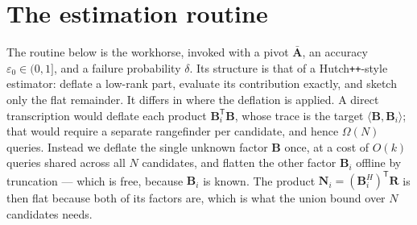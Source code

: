 \documentclass{article}
\renewcommand{\vec}[1]{\mathbf{#1}}          %
\newcommand{\T}{\mathsf{T}}                  %
\newcommand{\eps}{\varepsilon}
\newcommand{\inner}[2]{\langle #1, #2 \rangle}
\theoremstyle{remark}
\begin{document}
\section{The estimation routine}\label{sec:estimate}

The routine below is the workhorse, invoked with a pivot $\bar{\vec{A}}$, an accuracy $\eps_0 \in (0,1]$, and a failure probability $\delta$.
Its structure is that of a Hutch\texttt{++}-style estimator: deflate a low-rank part, evaluate its contribution exactly, and sketch only the flat remainder.
It differs in where the deflation is applied.
A direct transcription would deflate each product $\vec{B}_i^\T\vec{B}$, whose trace is the target $\inner{\vec{B}}{\vec{B}_i}$; that would require a separate rangefinder per candidate, and hence $\Omega(N)$ queries.
Instead we deflate the single unknown factor $\vec{B}$ once, at a cost of $O(k)$ queries shared across all $N$ candidates, and flatten the other factor $\vec{B}_i$ offline by truncation --- which is free, because $\vec{B}_i$ is known.
The product $\vec{N}_i = (\vec{B}_i^H)^\T\vec{R}$ is then flat because both of its factors are, which is what the union bound over $N$ candidates needs.
\end{document}
